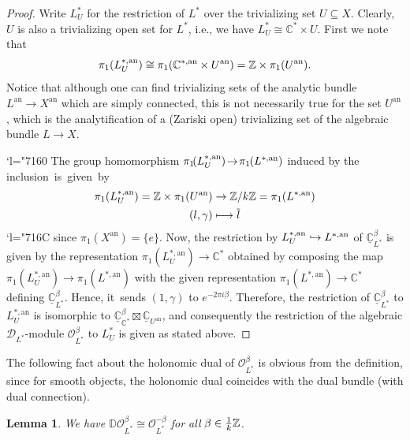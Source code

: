 \documentclass[11pt]{article}
\newcommand{\ie}{i.e.,\xspace}
\let\mathds\mathbb
\newcommand{\Changel}{\mathcode`l="7160}
\newcommand{\Changelback}{\mathcode`l="716C}
\newcommand\mto{\mathchoice{\longmapsto}{\mapsto}{\mapsto}{\mapsto}}
\newcommand\hto{\mathrel{\lhook\joinrel\to}}
\newtheorem{lem}[thm]{Lemma}
\newcommand{\dC}{{\mathds C}}\let\C\dC
\newcommand{\bD}{{\mathbb D}}\let\mbd\bD
\newcommand{\cD}{\mathscr{D}}
\newcommand{\cO}{\mathcal{O}}\let\O\cO
\begin{document}
\begin{proof}
Write $L_U^*$ for the restriction of $L^*$ over the trivializing set $U\subseteq X$. Clearly, $U$ is also a trivializing open set for $L^*$, \ie we have $L^*_{U}\cong \dC^*\times U$. First we note that
\[
\pi_1(L_U^{*,\mathrm{an}})\cong \pi_1(\dC^{*,\mathrm{an}}\times U^{\mathrm{an}})=\Z\times \pi_1(U^\mathrm{an}).
\]
Notice that although one can find trivializing sets of the analytic bundle $L^\mathrm{an}\to X^\mathrm{an}$ which are simply connected, this is not necessarily true for the set $U^\mathrm{an}$, which is the analytification of a (Zariski open) trivializing set of the algebraic bundle $L\to X$.

\Changel%
The group homomorphism $\pi_1\mkern-3mu(L_U^{*,\mathrm{an}}) \mkern-3mu\to\! \pi_1\mkern-1mu(L^{*,\mathrm{an}})$ induced by the inclusion~is~given~by
\begin{align*}
\pi_1(L_U^{*,\mathrm{an}}) = \Z\times \pi_1(U^\mathrm{an}) & \to \Z/k\Z = \pi_1(L^{*,\mathrm{an}}) \\
(l,\gamma) & \mto \overline{l}
\end{align*}\Changelback%
since $\pi_1(X^\mathrm{an})=\{e\}$.
Now, the restriction by $L_U^{*,\mathrm{an}} \hto L^{*,\mathrm{an}}$ of $\underline{\dC}^\beta_{L^*}$ is given by the representation $\pi_1(L_U^{*,\mathrm{an}})\to \dC^*$ obtained by composing the map $\pi_1(L_U^{*,\mathrm{an}}) \to \pi_1(L^{*,\mathrm{an}})$ with the given representation $\pi_1(L^{*,\mathrm{an}})\to \dC^*$ defining $\underline{\dC}^\beta_{L^*}$. Hence, it~sends $(1,\gamma)$ to $e^{-2\pi i \beta}$. Therefore, the restriction of $\underline{\dC}^\beta_{L^*}$ to $L^{*,\mathrm{an}}_U$ is isomorphic to $\underline{\dC}^\beta_{\C^*}\boxtimes \underline{\dC}_{U^\mathrm{an}}$, and consequently the restriction of the algebraic $\cD_{L^*}$\nobreakdash-mod\-ule $\cO_{L^*}^\beta$ to $L_U^*$ is given as stated above.
\end{proof}
The following fact about the holonomic dual of $\cO_{L^*}^\beta$ is obvious from the definition, since for smooth objects, the holonomic dual coincides with the dual bundle (with dual connection).

\begin{lem}\label{lem:OLbetaDual}
We have $\bD \cO_{L^*}^\beta\cong \cO_{L^*}^{-\beta}$
for all $\beta\in \frac{1}{k}\Z$.
\end{lem}
\end{document}
